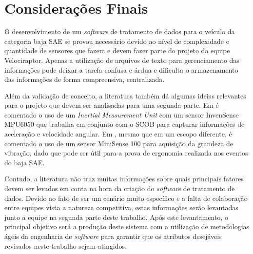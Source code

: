 \chapter{Considerações Finais}
	\label{ch:consideracoes}
O desenvolvimento de um \textit{software} de tratamento de dados para o veículo da categoria baja SAE se provou necessário devido ao nível de complexidade e quantidade de sensores que fazem e devem fazer parte do projeto da equipe Velociraptor. Apenas a utilização de arquivos de texto para gerenciamento das informações pode deixar a tarefa confusa e árdua e dificulta o armazenamento das informações de forma compreensiva, centralizada.

Além da validação de conceito, a literatura também dá algumas ideias relevantes para o projeto que devem ser analisadas para uma segunda parte. Em  é comentado o uso de um \textit{Inertial Measurement Unit} com um sensor InvenSense MPU6050 que trabalha em conjunto com o SCOB para capturar informações de aceleração e velocidade angular. Em , mesmo que em um escopo diferente, é comentado o uso de um sensor MiniSense 100 para aquisição da grandeza de vibração, dado que pode ser útil para a prova de ergonomia realizada nos eventos do baja SAE.

Contudo, a literatura não traz muitas informações sobre quais principais fatores devem ser levados em conta na hora da criação do \textit{software} de tratamento de dados. Devido ao fato de ser um cenário muito específico e a falta de colaboração entre equipes vista a natureza competitiva, estas informações serão levantadas junto a equipe na segunda parte deste trabalho. Após este levantamento, o principal objetivo será a produção deste sistema com a utilização de metodologias ágeis da engenharia de \textit{software} para garantir que os atributos desejáveis revisados neste trabalho sejam atingidos.        